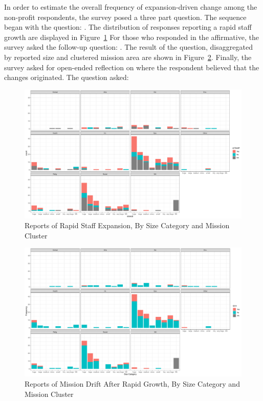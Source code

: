 In order to estimate the overall frequency of expansion-driven change among the non-profit respondents, the survey posed a three part question. The sequence began with the question: . The distribution of responses reporting a rapid staff growth are displayed in Figure~\ref{fig:q13staffsummary} For those who responded in the affirmative, the survey asked the follow-up question: . The result of the question, disaggregated by reported size and clustered mission area are shown in Figure~\ref{fig:q14summary}. Finally, the survey asked for open-ended reflection on where the respondent believed that the changes originated. The question asked:  

\begin{figure}
\centering
    \includegraphics[width=.85\columnwidth]{./Pictures/rapidstaffgrowthbysizeandsector.pdf}
    \caption{Reports of Rapid Staff Expansion, By Size Category and Mission Cluster}
    \label{fig:q13staffsummary}
\end{figure}


\begin{figure}
\centering
    \includegraphics[width=.85\columnwidth]{./Pictures/missiondriftaftergrowth.pdf}
    \caption{Reports of Mission Drift After Rapid Growth, By Size Category and Mission Cluster}
    \label{fig:q14summary}
\end{figure}

